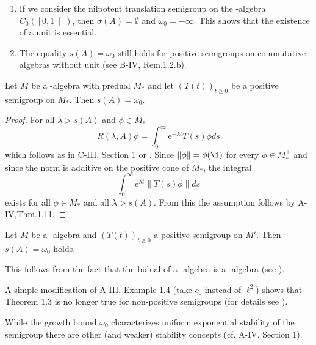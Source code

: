 \begin{remark}\label{rem:d4-1.2}
\begin{enumerate}[\upshape (i), wide, labelindent=.5em]
\item
If we consider the nilpotent translation semigroup on the \CA-algebra $C_{0}( \left[0,1\right[ )$, then $\sigma(A) = \emptyset$ and $\omega_{0} = -\infty$.
This shows that the existence of a unit is essential.

\item
The equality $s(A) = \omega_{0}$ still holds for positive semigroups on commutative \CA-algebras without unit (see B-IV, Rem.1.2.b).
\end{enumerate}
\end{remark}
\begin{theorem}\label{thm:d4-1.3}
Let $M$ be a \WA-algebra with predual $M_{*}$ and let $(T(t))_{t \geq 0}$ be a positive semigroup on $M_{*}$.
Then $s(A) = \omega_{0}$.
\end{theorem}
\begin{proof}
For all $\lambda > s(A)$ and $\phi \in M_{*}$
\[
R(\lambda,A)\phi = \int_{0}^{\infty} \mathrm{e}^{-\lambda t}T(s)\phi ds
\]
which follows as in C-III, Section 1 or \citet[Theorem 3]{greinervoigtwolff:1981}.
Since $\|\phi\| = \phi(\1)$ for every $\phi \in M_{*}^{+}$ and since the norm is additive on the positive cone of $M_{*}$, the integral
\[
	\int_{0}^{\infty} \mathrm{e}^{\lambda t}\|T(s)\phi\|ds
\]
exists for all $\phi \in M_{*}$ and all $\lambda > s(A)$.
From this the assumption follows by A-IV,Thm.1.11.
\end{proof}
\begin{corollary}\label{cor:d4-1.4}
Let $M$ be a \CA-algebra and $(T(t))_{t \geq 0}$ a positive semigroup on $M'$.
Then $s(A) = \omega_{0}$ holds.
\end{corollary}
\noindent This follows from the fact that the bidual of a \CA-algebra is a \WA-algebra (see \citet[Theorem III.2.4.]{takesaki:1979}).
\begin{remark}\label{rem:d4-1.5}
A simple modification of A-III, Example 1.4 (take $c_{0}$ instead of $\ell^2$) shows that Theorem 1.3 is no longer true for non-positive semigroups (for details see \citet[Beispiel 2.5]{grohneubrander:1981}).

While the growth bound $\omega_{0}$ characterizes uniform exponential stability of the semigroup there are other (and weaker) stability concepts (cf. A-IV, Section 1).
\end{remark}
